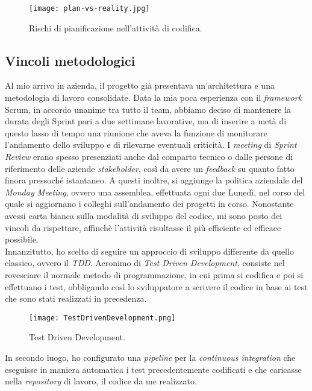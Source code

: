 \begin{figure}[h]
\texttt{[image: plan-vs-reality.jpg]}
\centering
\caption{Rischi di pianificazione nell'attività di codifica.} 
\label{fig:plan-vs-reality}
\end{figure}

\subsection{Vincoli metodologici}
Al mio arrivo in azienda, il progetto già presentava un'architettura e una metodologia di lavoro consolidate.
Data la mia poca esperienza con il \textit{framework} Scrum, in accordo unanime tra tutto il team, abbiamo deciso di mantenere la durata degli Sprint pari a due settimane lavorative, ma di inserire a metà di questo lasso di tempo una riunione che aveva la funzione di monitorare l'andamento dello sviluppo e di rilevarne eventuali criticità. I \textit{meeting} di \textit{Sprint Review} erano spesso presenziati anche dal comparto tecnico o dalle persone di riferimento delle aziende \textit{stakeholder}, così da avere un \textit{feedback} su quanto fatto finora pressoché istantaneo.
A questi inoltre, si aggiunge la politica aziendale del \textit{Monday Meeting}, ovvero una assemblea, effettuata ogni due Lunedì, nel corso del quale si aggiornano i colleghi sull'andamento dei progetti in corso.
Nonostante avessi carta bianca sulla modalità di sviluppo del codice, mi sono posto dei vincoli da rispettare, affinchè l'attività risultasse il più efficiente ed efficace possibile.\\
Innanzitutto, ho scelto di seguire un approccio di sviluppo differente da quello classico, ovvero il \textit{TDD}. Acronimo di \textit{Test Driven Development}, consiste nel rovesciare il normale metodo di programmazione, in cui prima si codifica e poi si effettuano i test, obbligando così lo sviluppatore a scrivere il codice in base ai test che sono stati realizzati in precedenza.
\begin{figure}[h]
\texttt{[image: TestDrivenDevelopment.png]}
\centering
\caption{Test Driven Development.} 
\label{fig:tdd}
\end{figure}
In secondo luogo, ho configurato una \textit{pipeline} per la \textit{continuous integration} che eseguisse in maniera automatica i test precedentemente codificati e che caricasse nella \textit{repository} di lavoro, il codice da me realizzato.
